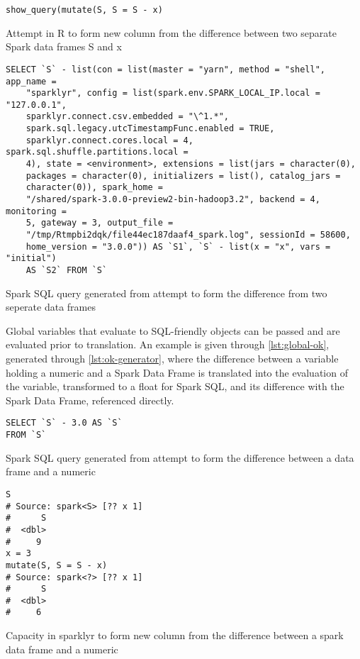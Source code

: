 \begin{listing}
	\begin{verbatim}
show_query(mutate(S, S = S - x)
\end{verbatim}
	\caption{Attempt in R to form new column from the difference between two separate Spark data frames S and x}
	\label{lst:bad}
\end{listing}

\begin{listing}
	\begin{verbatim}
SELECT `S` - list(con = list(master = "yarn", method = "shell", app_name =
	"sparklyr", config = list(spark.env.SPARK_LOCAL_IP.local = "127.0.0.1",
	sparklyr.connect.csv.embedded = "\^1.*",
	spark.sql.legacy.utcTimestampFunc.enabled = TRUE,
	sparklyr.connect.cores.local = 4, spark.sql.shuffle.partitions.local =
	4), state = <environment>, extensions = list(jars = character(0),
	packages = character(0), initializers = list(), catalog_jars =
	character(0)), spark_home =
	"/shared/spark-3.0.0-preview2-bin-hadoop3.2", backend = 4, monitoring =
	5, gateway = 3, output_file =
	"/tmp/Rtmpbi2dqk/file44ec187daaf4_spark.log", sessionId = 58600,
	home_version = "3.0.0")) AS `S1`, `S` - list(x = "x", vars = "initial")
	AS `S2` FROM `S`
\end{verbatim}
	\caption{Spark SQL query generated from attempt to form the difference from two seperate data frames}
	\label{lst:computer-no}
\end{listing}

Global variables that evaluate to SQL-friendly objects can be passed and
are evaluated prior to translation. An example is given through
\cref{lst:global-ok}, generated through \cref{lst:ok-generator}, where
the difference between a variable holding a numeric and a Spark Data
Frame is translated into the evaluation of the variable, transformed to
a float for Spark SQL, and its difference with the Spark Data Frame,
referenced directly.

\begin{listing}
	\begin{verbatim}
SELECT `S` - 3.0 AS `S`
FROM `S`
\end{verbatim}
	\caption{Spark SQL query generated from attempt to form the difference between a data frame and a numeric}
	\label{lst:global-ok}
\end{listing}

\begin{listing}
	\begin{verbatim}
S
# Source: spark<S> [?? x 1]
#      S
#  <dbl>
#     9
x = 3
mutate(S, S = S - x)
# Source: spark<?> [?? x 1]
#      S
#  <dbl>
#     6
\end{verbatim}
	\caption{Capacity in sparklyr to form new column from the difference between a spark data frame and a numeric}
	\label{lst:ok-generator}
\end{listing}

